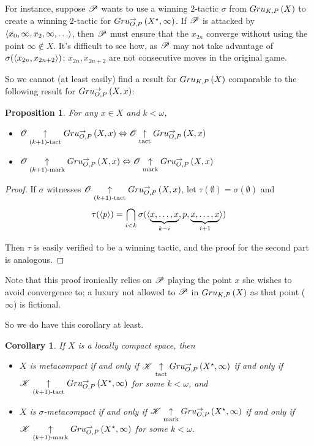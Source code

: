 \documentclass{amsart}
\newtheorem{proposition}[theorem]{Proposition}
\newtheorem{corollary}[theorem]{Corollary}
\theoremstyle{definition}
\begin{document}
For instance, suppose $\mathscr{P}$ wants to use a winning $2$-tactic $\sigma$ from
$Gru_{K,P}\left({X}\right)$ to create a winning $2$-tactic for
$Gru_{O,P}^{\to}\left({X^\star},{\infty}\right)$. If $\mathscr{P}$ is attacked by
$\<x_0,\infty,x_2,\infty,\dots\>$, then $\mathscr{P}$ must ensure that the $x_{2n}$
converge without using the point $\infty\not\in X$.
It's difficult to see how, as $\mathscr{P}$ may not take advantage of
$\sigma(\langle x_{2n},x_{2n+2}\rangle)$;
$x_{2n},x_{2n+2}$ are not consecutive moves in the original game.

So we cannot (at least easily) find a result for $Gru_{K,P}\left({X}\right)$
comparable to the following result for $Gru_{O,P}^{\to}\left({X},{x}\right)$:

\begin{proposition} For any $x\in X$ and $k<\omega$,
  \begin{itemize}
    \item
      $
      \mathscr{O}\underset{(k+1)\text{-tact}}{\uparrow}Gru_{O,P}^{\to}\left({X},{x}\right)
        \Leftrightarrow
      \mathscr{O}\underset{\text{tact}}{\uparrow}Gru_{O,P}^{\to}\left({X},{x}\right)
      $
    \item
      $
      \mathscr{O}\underset{(k+1)\text{-mark}}{\uparrow}Gru_{O,P}^{\to}\left({X},{x}\right)
        \Leftrightarrow
      \mathscr{O}\underset{\text{mark}}{\uparrow}Gru_{O,P}^{\to}\left({X},{x}\right)
      $
  \end{itemize}
\end{proposition}

\begin{proof}
  If $\sigma$ witnesses $\mathscr{O}\underset{(k+1)\text{-tact}}{\uparrow}Gru_{O,P}^{\to}\left({X},{x}\right)$,
  let $\tau(\emptyset)=\sigma(\emptyset)$ and
    \[
      \tau(\langle p\rangle)
        =
      \bigcap_{i< k}
      \sigma(\langle\underbrace{x,\dots,x}_{k-i},p,\underbrace{x,\dots,x}_{i+1}\rangle)
    \]

  Then $\tau$ is easily verified to be a winning tactic, and
  the proof for the second part is analogous.
\end{proof}

Note that this proof ironically relies on $\mathscr{P}$ playing
the point $x$ she wishes to avoid convergence to; a luxury not allowed to
$\mathscr{P}$ in $Gru_{K,P}\left({X}\right)$ as that point ($\infty$) is fictional.

So we do have this corollary at least.

\begin{corollary}
  If $X$ is a locally compact space, then
  \begin{itemize}
    \item
    $X$ is metacompact if and only if
    $\mathscr{K}\underset{\text{tact}}{\uparrow}Gru_{O,P}^{\to}\left({X^\star},{\infty}\right)$ if and only if
    $\mathscr{K}\underset{(k+1)\text{-tact}}{\uparrow}Gru_{O,P}^{\to}\left({X^\star},{\infty}\right)$
    for some $k<\omega$, and
    \item
    $X$ is $\sigma$-metacompact if and only if
    $\mathscr{K}\underset{\text{mark}}{\uparrow}Gru_{O,P}^{\to}\left({X^\star},{\infty}\right)$ if and only if
    $\mathscr{K}\underset{(k+1)\text{-mark}}{\uparrow}Gru_{O,P}^{\to}\left({X^\star},{\infty}\right)$
    for some $k<\omega$.
  \end{itemize}
\end{corollary}
\end{document}

